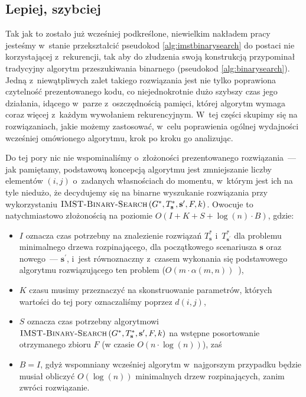 


\subsection{Lepiej, szybciej}



Tak jak to zostało już wcześniej podkreślone, niewielkim nakładem pracy jesteśmy w~stanie przekształcić pseudokod \ref{alg:imstbinarysearch} do postaci nie korzystającej z~rekurencji, tak aby do złudzenia swoją konstrukcją przypominał tradycyjny algorytm przeszukiwania binarnego (pseudokod \ref{alg:binarysearch}).
Jedną z~niewątpliwych zalet takiego rozwiązania jest nie tylko poprawiona czytelność prezentowanego kodu, co niejednokrotnie dużo szybszy czas jego działania, idącego w~parze z~oszczędnością pamięci, której algorytm wymaga coraz więcej z~każdym wywołaniem rekurencyjnym.
W~tej części skupimy się na rozwiązaniach, jakie możemy zastosować, w~celu poprawienia ogólnej wydajności wcześniej omówionego algorytmu, krok po kroku go analizując.

Do tej pory nic nie wspominaliśmy o~złożoności prezentowanego rozwiązania~--- jak pamiętamy, podstawową koncepcją algorytmu jest zmniejszanie liczby elementów $\left( i, j \right)$ o~zadanych własnościach do momentu, w~którym jest ich na tyle niedużo, że decydujemy się na binarne wyszukanie rozwiązania przy wykorzystaniu $\textsc{IMST-Binary-Search} \left( G^{\ast}, T^{\ast}_{\textbf{s}}, \textbf{s}^{\prime}, F, k \right)$.
Owocuje to natychmiastowo złożonością na poziomie $O \left( I + K + S + \log \left( n \right) \cdot B \right)$, gdzie:

\begin{itemize}
	\item $I$ oznacza czas potrzebny na znalezienie rozwiązań $T^{\ast}_{\textbf{s}}$ i~$T^{\ast}_{\textbf{s}^{\prime}}$ dla problemu minimalnego drzewa rozpinającego, dla początkowego scenariusza $\textbf{s}$ oraz nowego~--- $\textbf{s}^{\prime}$, i~jest równoznaczny z~czasem wykonania się podstawowego algorytmu rozwiązującego ten problem ($O \left( m \cdot \alpha \left( m, n \right) \right)$~\cite{Chazelle:2000:MST:355541.355562}),
	\item $K$ czasu musimy przeznaczyć na skonstruowanie parametrów, których wartości do tej pory oznaczaliśmy poprzez $d \left( i, j \right)$,
	\item $S$ oznacza czas potrzebny algorytmowi $\textsc{IMST-Binary-Search} \left( G^{\ast}, T^{\ast}_{\textbf{s}}, \textbf{s}^{\prime}, F, k \right)$ na wstępne posortowanie otrzymanego zbioru $F$ (w czasie $O \left( n \cdot \log \left( n \right) \right)$), zaś
	\item $B = I$, gdyż wspomniany wcześniej algorytm w~najgorszym przypadku będzie musiał obliczyć $O \left( \log \left( n \right) \right)$ minimalnych drzew rozpinających, zanim zwróci rozwiązanie.
\end{itemize}

